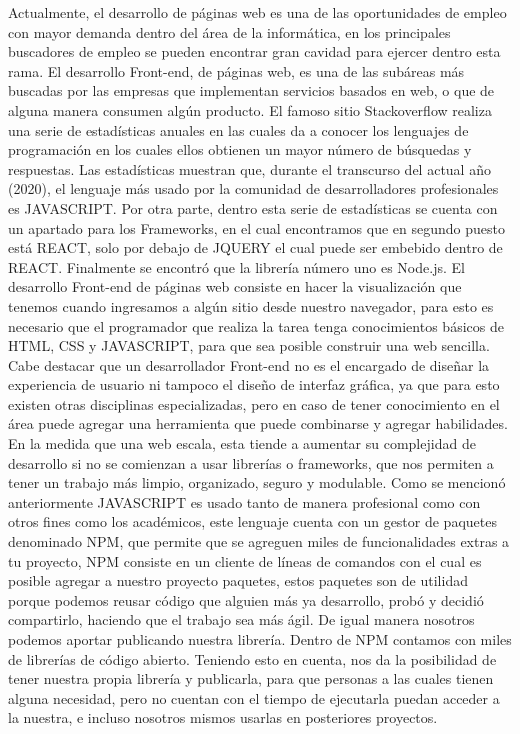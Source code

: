 Actualmente, el desarrollo de páginas web es una de las oportunidades de empleo con mayor demanda dentro del área de la informática, en los principales buscadores de empleo se pueden encontrar gran cavidad para ejercer dentro esta rama. El desarrollo Front-end, de páginas web, es una de las subáreas más buscadas por las empresas que implementan servicios basados en web, o que de alguna manera consumen algún producto. 
El famoso sitio Stackoverflow realiza una serie de estadísticas anuales en las cuales da a conocer los lenguajes de programación en los cuales ellos obtienen un mayor número de búsquedas y respuestas. Las estadísticas muestran que, durante el transcurso del actual año (2020), el lenguaje más usado por la comunidad de desarrolladores profesionales es JAVASCRIPT. 
Por otra parte, dentro esta serie de estadísticas se cuenta con un apartado para los Frameworks, en el cual encontramos que en segundo puesto está REACT, solo por debajo de JQUERY el cual puede ser embebido dentro de REACT.  Finalmente se encontró que la librería número uno es Node.js. 
El desarrollo Front-end de páginas web consiste en hacer la visualización que tenemos cuando ingresamos a algún sitio desde nuestro navegador, para esto es necesario que el programador que realiza la tarea tenga conocimientos básicos de HTML, CSS y JAVASCRIPT, para que sea posible construir una web sencilla. Cabe destacar que un desarrollador Front-end no es el encargado de diseñar la experiencia de usuario ni tampoco el diseño de interfaz gráfica, ya que para esto existen otras disciplinas especializadas, pero en caso de tener conocimiento en el área puede agregar una herramienta que puede combinarse y agregar habilidades.
\newline
En la medida que una web escala, esta tiende a aumentar su complejidad de desarrollo si no se comienzan a usar librerías o frameworks, que nos permiten a tener un trabajo más limpio, organizado, seguro y modulable. 
Como se mencionó anteriormente JAVASCRIPT es usado tanto de manera profesional como con otros fines como los académicos, este lenguaje cuenta con un gestor de paquetes denominado NPM, que permite que se agreguen miles de funcionalidades extras a tu proyecto, NPM consiste en un cliente de líneas de comandos con el cual es posible agregar a nuestro proyecto paquetes, estos paquetes son de utilidad porque podemos reusar código que alguien más ya desarrollo, probó y decidió compartirlo, haciendo que el trabajo sea más ágil.  De igual manera nosotros podemos aportar publicando nuestra librería. Dentro de NPM contamos con miles de librerías de código abierto.  
Teniendo esto en cuenta, nos da la posibilidad de tener nuestra propia librería y publicarla, para que personas a las cuales tienen alguna necesidad, pero no cuentan con el tiempo de ejecutarla puedan acceder a la nuestra, e incluso nosotros mismos usarlas en posteriores proyectos. 


